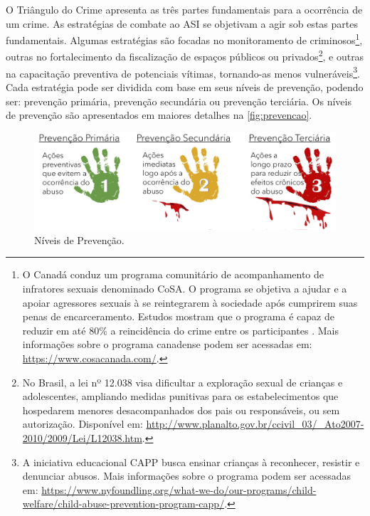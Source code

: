 O Triângulo do Crime apresenta as três partes fundamentais para a ocorrência de um crime. As estratégias de combate ao \ac{ASI} se objetivam a agir sob estas partes fundamentais. Algumas estratégias são focadas no monitoramento de criminosos\footnote{\label{note:nota1}O Canadá conduz um programa comunitário de acompanhamento de infratores sexuais denominado \ac{CoSA}. O programa se objetiva a ajudar e a apoiar agressores sexuais à se reintegrarem à sociedade após cumprirem suas penas de encarceramento. Estudos mostram que o programa é capaz de reduzir em até 80\% a reincidência do crime entre os participantes \cite{wilson2009circles}. Mais informações sobre o programa canadense podem ser acessadas em: \url{https://www.cosacanada.com/}.}, outras no fortalecimento da fiscalização de espaços públicos ou privados\footnote{No Brasil, a lei nº 12.038 visa dificultar a exploração sexual de crianças e adolescentes, ampliando medidas punitivas para os estabelecimentos que hospedarem menores desacompanhados dos pais ou responsáveis, ou sem autorização. Disponível em: \url{http://www.planalto.gov.br/ccivil_03/_Ato2007-2010/2009/Lei/L12038.htm}.}, e outras na capacitação preventiva de potenciais vítimas, tornando-as menos vulneráveis\footnote{A iniciativa educacional \ac{CAPP} busca ensinar crianças à reconhecer, resistir e denunciar abusos. Mais informações sobre o programa podem ser acessadas em: \url{https://www.nyfoundling.org/what-we-do/our-programs/child-welfare/child-abuse-prevention-program-capp/}.}. Cada estratégia pode ser dividida com base em seus níveis de prevenção, podendo ser: prevenção primária, prevenção secundária ou prevenção terciária. Os níveis de prevenção são apresentados em maiores detalhes na \autoref{fig:prevencao}.


\begin{figure}[htb]
	\caption{\label{fig:prevencao}Níveis de Prevenção.}
    \vspace{0.4cm}
    \hspace{-0.75cm}\includegraphics[width=1.1\linewidth]{./Visuais/Prevencao.pdf}

\end{figure}

